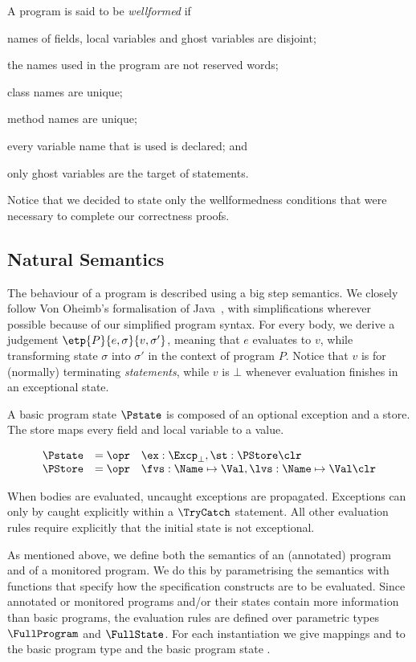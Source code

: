 A program is said to be \emph{wellformed} if
\begin{inparaenum}
\item names of fields, local variables and ghost variables are
disjoint;
\item the names used in the program are not reserved words;
\item class names are unique;
\item method names are unique;
\item every variable name that is used is declared; and
\item only ghost variables are the target of \Set statements.
\end{inparaenum}
Notice that we decided to state only the wellformedness conditions
that were necessary to complete our correctness proofs.

\subsection{Natural Semantics}\label{SecSemantics}
The behaviour of a program is described using a big step semantics. We
closely follow Von Oheimb's formalisation of Java~\cite{Oheimb01},
with simplifications wherever possible because of our simplified
program syntax. For every body, we derive a judgement
$\etp{P}{e,\sigma}{v,\sigma'}$, meaning that  $e$
evaluates to $v$, while transforming state $\sigma$ into $\sigma'$ in
the context of program \(P\). Notice that \(v\) is \One for
(normally) terminating \emph{statements}, while \(v\) is \(\bot\) whenever
evaluation finishes in an exceptional state.

A basic program state \(\Pstate\) is composed of an optional exception
and a store.  The store maps every field and local variable to a
value.

\[
\begin{array}{rcl}
\Pstate & = \opr & \ex : \Excp_{\bot}, \st : \PStore \clr\\
\PStore & = \opr & \fvs : \Name \mapsto \Val, \lvs : \Name \mapsto \Val \clr
\end{array}
\]

When bodies are evaluated, uncaught exceptions are
propagated. Exceptions can only by caught explicitly within a
\(\TryCatch\) statement. All other evaluation rules require explicitly
that the initial state is not exceptional.

As mentioned above, we define both the semantics of an (annotated)
program and of a monitored program. We do this by parametrising the
semantics with functions that specify how the specification constructs
are to be evaluated. Since annotated or monitored programs and/or
their states contain more information than basic programs, the
evaluation rules are defined over parametric types
\(\FullProgram\) and \(\FullState\). For each instantiation we give
mappings \program and \progstate to the basic program type \Program
and the basic program state \Pstate.

